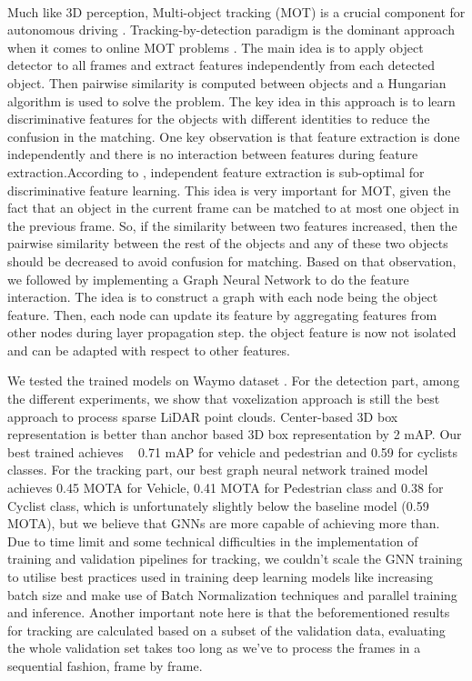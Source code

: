 \documentclass[10pt,twocolumn,letterpaper]{article}
\begin{document}
\paragraph{}
Much like 3D perception, Multi-object tracking (MOT) is a crucial component for autonomous driving \cite{luo2018fast}. Tracking-by-detection paradigm is the dominant approach when it comes to online MOT problems \cite{bewley2016simple, weng2019baseline}. The main idea is to apply object detector to all frames and extract features independently from each detected object. Then pairwise similarity is computed between objects and a Hungarian algorithm \cite{kuhn1955hungarian} is used to solve the problem. The key idea in this approach is to learn discriminative features for the objects with different identities to reduce the confusion in the matching. One key observation is that feature extraction is done independently and there is no interaction between features during feature extraction.According to \cite{weng2020gnn3dmot}, independent feature extraction is sub-optimal for discriminative feature learning. This idea is very important for MOT, given the fact that an object in the current frame can be matched to at most one object in the previous frame. So, if the similarity between two features increased, then the pairwise similarity between the rest of the objects and any of these two objects should be decreased to avoid confusion for matching. Based on that observation, we followed \cite{weng2020gnn3dmot} by implementing a Graph Neural Network to do the feature interaction. The idea is to construct a graph with each node being the object feature. Then, each node can update its feature by aggregating features from other nodes during layer propagation step. the object feature is now not isolated and can be adapted with respect to other features.

We tested the trained models on Waymo dataset \cite{sun2020scalability}. For the detection part, among the different experiments, we show that voxelization approach is still the best approach to process sparse LiDAR point clouds. Center-based 3D box representation is better than anchor based 3D box representation by 2 mAP. Our best trained achieves ~ 0.71 mAP for vehicle and pedestrian and 0.59 for cyclists classes. For the tracking part, our best graph neural network trained model achieves 0.45 MOTA for Vehicle, 0.41 MOTA for Pedestrian class and 0.38 for Cyclist class, which is unfortunately slightly below the baseline model (0.59 MOTA), but we believe that GNNs are more capable of achieving more than. Due to time limit and some technical difficulties in the implementation of training and validation pipelines for tracking, we couldn't scale the GNN training to utilise best practices used in training deep learning models like increasing batch size and make use of Batch Normalization techniques and parallel training and inference. Another important note here is that the beforementioned results for tracking are calculated based on a subset of the validation data, evaluating the whole validation set takes too long as we've to process the frames in a sequential fashion, frame by frame.
\end{document}
